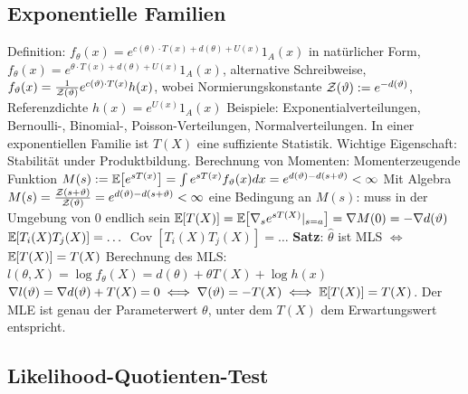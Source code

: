 \subsection{Exponentielle Familien}

\begin{outline}
    \1 Definition: $f_\theta(x)=e^{c(\theta) \cdot T(x)+d(\theta)+U(x)}1_A(x)$
        \2 in natürlicher Form, $f_\theta(x)=e^{\theta\cdot T(x)+d(\theta)+U(x)} 1_A(x)$,
        \2 alternative Schreibweise, $f_\vartheta(x)=\frac{1}{\mathcal{Z}(\vartheta)}e^{c(\vartheta)\cdot T(x)}h(x)$, wobei 
            \3 Normierungskonstante $\mathcal{Z}(\vartheta):=e^{-d(\vartheta)}$, 
            \3 Referenzdichte $h(x)=e^{U(x)}1_A(x)$ 
    \1 Beispiele: Exponentialverteilungen, Bernoulli-, Binomial-, Poisson-Verteilungen, Normalverteilungen.
    \1 In einer exponentiellen Familie ist $T(X)$ eine suffiziente Statistik.
    \1 Wichtige Eigenschaft: Stabilität under Produktbildung.
    \1 Berechnung von Momenten:
        \2 Momenterzeugende Funktion $M(s):=\mathbb{E}\hspace{-2pt}\left[{e^{sT(x)}}\right]=\int e^{sT(x)}f_\vartheta(x)dx = e^{d(\vartheta)-d(s+\vartheta)}<\infty$
        \2 Mit Algebra $M(s)=\frac{\mathcal{Z}(s+\vartheta)}{\mathcal{Z}(\vartheta)}=e^{d(\vartheta)-d(s+\vartheta)}<\infty$
            \3 eine Bedingung an $M(s)$: muss in der Umgebung von $0$ endlich sein
            \3 $\mathbb{E}\hspace{-2pt}\left[{T(X)}\right]=\mathbb{E}\hspace{-2pt}\left[{\nabla_s e^{sT(X)}|_{s=a}}\right]=\nabla M(0)=-\nabla d(\vartheta)$
            \3 $\mathbb{E}\hspace{-2pt}\left[{T_i(X)T_j(X)}\right]=\ldots$
            \3 $\operatorname{Cov}[T_i(X)T_j(X)]=\ldots$
    \1 \textbf{Satz}: $\hat{\theta}$ ist MLS $\iff$ $\mathbb{E}\hspace{-2pt}\left[{T(X)}\right]=T(X)$
    \1 Berechnung des MLS:
        \2 $l(\theta,X)=\log f_\theta (X)=d(\theta)+\theta T(X)+\log h(x)$
        \2 $\nabla l(\vartheta)=\nabla d(\vartheta) + T(X)=0 \iff \nabla(\vartheta)=-T(X) \iff \mathbb{E}\hspace{-2pt}\left[{T(X)}\right]=T(X)$. Der MLE ist genau der Parameterwert $\theta$, unter dem $T(X)$ dem Erwartungswert entspricht.
\end{outline}

\subsection{Likelihood-Quotienten-Test}

